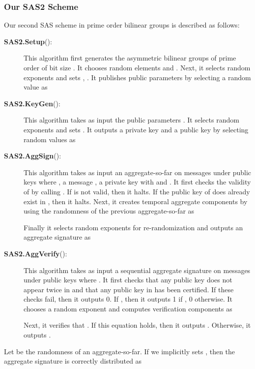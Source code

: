 \documentclass[11pt,letterpaper]{article}
\newcommand{\tb}[1]{\textbf{#1}}
\begin{document}
\subsubsection{Our SAS2 Scheme}

Our second SAS scheme in prime order bilinear groups is described as follows:

\begin{description}
\item [\tb{SAS2.Setup}():] This algorithm first generates the
    asymmetric bilinear groups  of prime order  of bit
    size . It chooses random elements  and
    . Next, it selects random exponents  and sets , . It publishes public parameters by
    selecting a random value  as
    

\item [\tb{SAS2.KeyGen}():] This algorithm takes as input the public
    parameters . It selects random exponents 
    and sets . It outputs a
    private key  and a public key by selecting random
    values  as
    

\item [\tb{SAS2.AggSign}():] This
    algorithm takes as input an aggregate-so-far  on messages  under
    public keys  where , a message , a private
    key  with  and
    . It first checks the validity of  by calling
    . If  is not
    valid, then it halts. If the public key  of  does already exist
    in , then it halts. Next, it creates temporal aggregate
    components by using the randomness of the previous aggregate-so-far as
    
    Finally it selects random exponents  for
    re-randomization and outputs an aggregate signature as
    

\item [\tb{SAS2.AggVerify}():] This algorithm
    takes as input a sequential aggregate signature  on messages
     under public keys  where . It
    first checks that any public key does not appear twice in 
    and that any public key in  has been certified. If these
    checks fail, then it outputs 0. If , then it outputs 1 if , 0 otherwise. It chooses a random exponent  and computes verification components as
    
    Next, it verifies that . If this equation holds, then it outputs . Otherwise, it
    outputs .
\end{description}

Let  be the randomness of an aggregate-so-far. If we
implicitly sets , then the aggregate signature is correctly distributed as
    
\end{document}
